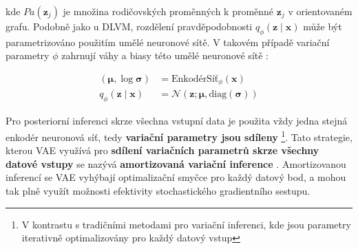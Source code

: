 kde $Pa(\textbf{z}_j)$ je množina rodičovských proměnných k proměnné $\textbf{z}_j$ v orientovaném grafu.
Podobně jako u DLVM, rozdělení pravděpodobnosti $q_\phi(\textbf{z}\mid\textbf{x})$ může být parametrizováno použitím umělé neuronové sítě.
V takovém případě variační parametry $\phi$ zahrnují váhy a biasy této umělé neuronové sítě \cite{Kingma2014}:


\begin{align}
    (\boldsymbol{\mu}, \log \boldsymbol{\sigma}) &= \text{EnkodérSíť}_\phi(\textbf{x}) \\
    q_\phi(\textbf{z}\mid\textbf{x}) &= \mathcal{N}(\textbf{z}; \boldsymbol{\mu}, \text{diag}(\boldsymbol{\sigma}))
\end{align}

Pro posteriorní inferenci skrze všechna vstupní data je použita vždy jedna stejná enkodér neuronová síť, tedy \textbf{variační parametry jsou sdíleny}
\footnote{V kontrastu s tradičními metodami pro variační inferenci, kde jsou parametry iterativně optimalizovány pro každý datový vstup}.
Tato strategie, kterou VAE využívá pro \textbf{sdílení variačních parametrů skrze všechny datové vstupy} se nazývá \textbf{amortizovaná variační inference} \cite{Gershman2014}.
Amortizovanou inferencí se VAE vyhýbají optimalizační smyčce pro každý datový bod, a mohou tak plně využít možnosti efektivity stochastického gradientního sestupu. \cite{Kingma2019}